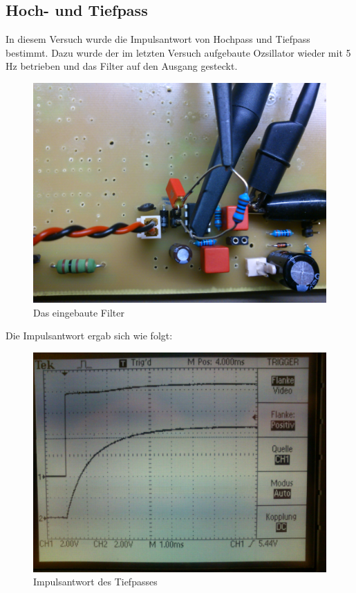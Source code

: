 \subsection{Hoch- und Tiefpass}
In diesem Versuch wurde die Impulsantwort von Hochpass und Tiefpass bestimmt. Dazu wurde der im letzten Versuch aufgebaute Ozsillator wieder mit 5 Hz betrieben und das Filter auf den Ausgang gesteckt.
\begin{figure}
	\centering
	\includegraphics[width=\linewidth]{versuch3/oszi/DSC_0274.JPG}
	\caption{Das eingebaute Filter}
\end{figure}
Die Impulsantwort ergab sich wie folgt:
\begin{figure}[H]
	\centering
	\includegraphics[width=\linewidth]{versuch3/oszi/DSC_0283.JPG}
	\caption{Impulsantwort des Tiefpasses}
\end{figure}

